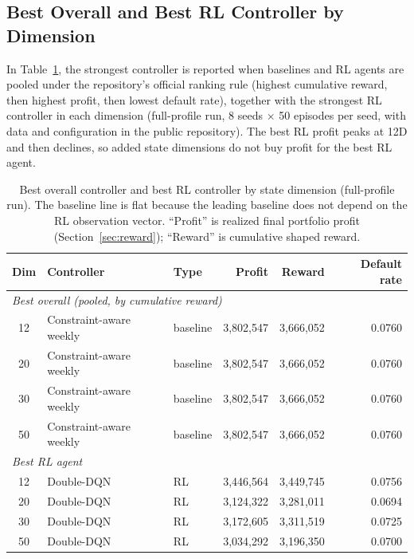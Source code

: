 \documentclass[preprint,review,authoryear,12pt]{elsarticle}
\begin{document}
\subsection{Best Overall and Best RL Controller by Dimension}

In Table~\ref{tab:best-by-dim}, the strongest controller is reported when baselines and
RL agents are pooled under the repository's official ranking rule (highest cumulative
reward, then highest profit, then lowest default rate), together with the strongest RL
controller in each dimension (full-profile run, 8 seeds $\times$ 50 episodes per seed,
with data and configuration in the public repository). The best RL profit peaks at 12D
and then declines, so added state dimensions do not buy profit for the best RL agent.

\begin{table}[t]
    \centering
    \small
    \caption{Best overall controller and best RL controller by state dimension
        (full-profile run). The baseline line is flat because the leading baseline does not
        depend on the RL observation vector. ``Profit'' is realized final portfolio profit
        (Section~\ref{sec:reward}); ``Reward'' is cumulative shaped reward.}
    \label{tab:best-by-dim}
    \setlength{\tabcolsep}{4pt}
    \begin{tabular}{c l l r r r}
        \toprule
        Dim & Controller              & Type     & Profit        & Reward        & Default rate \\
        \midrule
        \multicolumn{6}{l}{\textit{Best overall (pooled, by cumulative reward)}}                \\
        12  & Constraint-aware weekly & baseline & 3{,}802{,}547 & 3{,}666{,}052 & 0.0760       \\
        20  & Constraint-aware weekly & baseline & 3{,}802{,}547 & 3{,}666{,}052 & 0.0760       \\
        30  & Constraint-aware weekly & baseline & 3{,}802{,}547 & 3{,}666{,}052 & 0.0760       \\
        50  & Constraint-aware weekly & baseline & 3{,}802{,}547 & 3{,}666{,}052 & 0.0760       \\
        \midrule
        \multicolumn{6}{l}{\textit{Best RL agent}}                                              \\
        12  & Double-DQN              & RL       & 3{,}446{,}564 & 3{,}449{,}745 & 0.0756       \\
        20  & Double-DQN              & RL       & 3{,}124{,}322 & 3{,}281{,}011 & 0.0694       \\
        30  & Double-DQN              & RL       & 3{,}172{,}605 & 3{,}311{,}519 & 0.0725       \\
        50  & Double-DQN              & RL       & 3{,}034{,}292 & 3{,}196{,}350 & 0.0700       \\
        \bottomrule
    \end{tabular}
\end{table}
\end{document}
